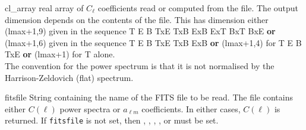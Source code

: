 \begin{qualifiers}
  \begin{qulist}{} %
    \item[cl\_array] %
      real array of $C_\ell$ coefficients read or computed from the
      file. The output dimension depends on the contents of the file. 
	This has dimension either (lmax+1,9) given in the sequence T E B
      TxE TxB ExB ExT BxT BxE {\bf or}
       (lmax+1,6) given in the sequence T E B
      TxE TxB ExB {\bf or} (lmax+1,4) for T E B TxE {\bf or} (lmax+1) for T
    alone. \\
     The convention for the power spectrum is that it is not
      normalised by the Harrison-Zeldovich (flat) spectrum.
%
    \item[fitsfile] %
    String containing the name of the FITS file to be read. The
    file contains either $C(\ell)$ power spectra or $a_{\ell m}$ coefficients. In either
    cases, $C(\ell)$ is returned. If {\tt fitsfile} is not set, then
,
,
,
,
 or
must be set.
  \end{qulist}
\end{qualifiers}

